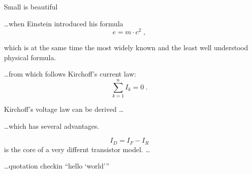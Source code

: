 \documentclass{article}
\begin{document}
Small is beautiful

\ldots when Einstein %
introduced his formula
\begin{equation}
  e = m \cdot c^2 \; , %
\end{equation}

which is at the same time the %
most widely known and the least well understood physical formula.

\ldots from which follows Kirchoff's current law:
\begin{equation}
  \sum_{k=1}^{n} I_k = 0 \; .
\end{equation}

Kirchoff's voltage law can be derived \ldots

\ldots which has several advantages.

\begin{equation}
  I_D =I_F - I_R
\end{equation}
is the core of a very differnt transistor model. \ldots

\ldots quotation checkin ``hello `world'''
\begin{comment}
Finally understood difference between a blank line between texts vs
\\:

1. a blank line between texts makes a new paragraph (indented on left)
2. a \\ simply is MY specification of cutting of the current paragraph (no indentation on left for the new line)
\end{comment}
\end{document}
